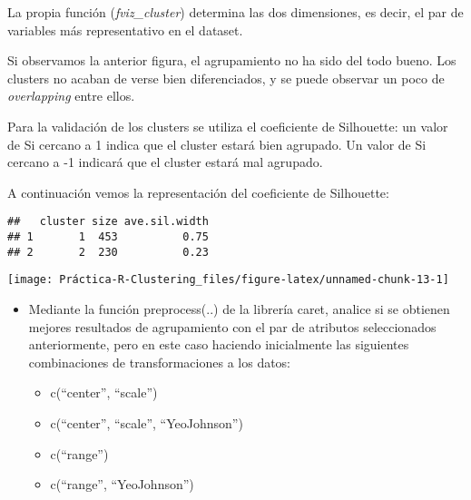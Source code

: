 \documentclass[]{article}
\newenvironment{Shaded}{\begin{snugshade}}{\end{snugshade}}
\newcommand{\CommentTok}[1]{\textcolor[rgb]{0.56,0.35,0.01}{\textit{#1}}}
\newcommand{\KeywordTok}[1]{\textcolor[rgb]{0.13,0.29,0.53}{\textbf{#1}}}
\newcommand{\NormalTok}[1]{#1}
\newcommand{\OperatorTok}[1]{\textcolor[rgb]{0.81,0.36,0.00}{\textbf{#1}}}
\newcommand{\StringTok}[1]{\textcolor[rgb]{0.31,0.60,0.02}{#1}}
\providecommand{\tightlist}{%
  \setlength{\itemsep}{0pt}\setlength{\parskip}{0pt}}
\begin{document}
La propia función (\emph{fviz\_cluster}) determina las dos dimensiones,
es decir, el par de variables más representativo en el dataset.

Si observamos la anterior figura, el agrupamiento no ha sido del todo
bueno. Los clusters no acaban de verse bien diferenciados, y se puede
observar un poco de \emph{overlapping} entre ellos.

Para la validación de los clusters se utiliza el coeficiente de
Silhouette: un valor de Si cercano a 1 indica que el cluster estará bien
agrupado. Un valor de Si cercano a -1 indicará que el cluster estará mal
agrupado.

A continuación vemos la representación del coeficiente de Silhouette:

\begin{Shaded}
\end{Shaded}

\begin{verbatim}
##   cluster size ave.sil.width
## 1       1  453          0.75
## 2       2  230          0.23
\end{verbatim}

\begin{center}\texttt{[image: Práctica-R-Clustering\_files/figure-latex/unnamed-chunk-13-1]} \end{center}

\begin{itemize}
\item
  Mediante la función preprocess(..) de la librería caret, analice si se
  obtienen mejores resultados de agrupamiento con el par de atributos
  seleccionados anteriormente, pero en este caso haciendo inicialmente
  las siguientes combinaciones de transformaciones a los datos:

  \begin{itemize}
  \tightlist
  \item
    c(``center'', ``scale'')
  \item
    c(``center'', ``scale'', ``YeoJohnson'')
  \item
    c(``range'')
  \item
    c(``range'', ``YeoJohnson'')
  \end{itemize}
\end{itemize}
\end{document}
